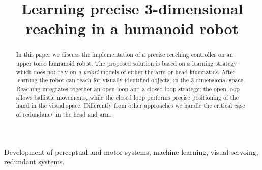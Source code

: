 \documentclass[conference,letterpaper]{IEEEtran}
\begin{document}
\title{\huge Learning precise 3-dimensional reaching in a humanoid robot}

\author{
%
\and
{}
\and
{}
}%

\maketitle
\begin{abstract}
In this paper we discuss the implementation of a precise reaching controller 
on an upper torso humanoid robot. The proposed solution is based 
on a learning strategy which does not rely on \emph{a priori} models of either
the arm or head kinematics. After learning the robot can reach for visually 
identified objects, in the 3-dimensional space. Reaching integrates together 
an open loop and a closed loop strategy; the open loop allows ballistic 
movements, while the closed loop performs precise positioning of the hand in 
the visual space. Differently from other approaches we handle the critical 
case of redundancy in the head and arm. 
\end{abstract}

\begin{keywords}
Development of perceptual and motor systems, machine learning, visual servoing, redundant systems.
\end{keywords}
%








%



\end{document}
